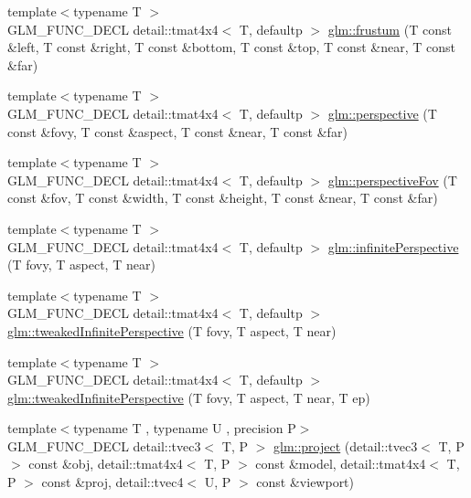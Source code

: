 \begin{DoxyCompactItemize}
\item 
{\footnotesize template$<$typename T $>$ }\\G\+L\+M\+\_\+\+F\+U\+N\+C\+\_\+\+D\+E\+CL detail\+::tmat4x4$<$ T, defaultp $>$ \hyperlink{group__gtc__matrix__transform_ga486d3d6819c04880559f3dccd38f9f58}{glm\+::frustum} (T const \&left, T const \&right, T const \&bottom, T const \&top, T const \&near, T const \&far)
\item 
{\footnotesize template$<$typename T $>$ }\\G\+L\+M\+\_\+\+F\+U\+N\+C\+\_\+\+D\+E\+CL detail\+::tmat4x4$<$ T, defaultp $>$ \hyperlink{group__gtc__matrix__transform_ga6c82aa0ea748cfbb16887d81cf6c5a10}{glm\+::perspective} (T const \&fovy, T const \&aspect, T const \&near, T const \&far)
\item 
{\footnotesize template$<$typename T $>$ }\\G\+L\+M\+\_\+\+F\+U\+N\+C\+\_\+\+D\+E\+CL detail\+::tmat4x4$<$ T, defaultp $>$ \hyperlink{group__gtc__matrix__transform_gac00bf68d4f7ec62380b84c5354567f71}{glm\+::perspective\+Fov} (T const \&fov, T const \&width, T const \&height, T const \&near, T const \&far)
\item 
{\footnotesize template$<$typename T $>$ }\\G\+L\+M\+\_\+\+F\+U\+N\+C\+\_\+\+D\+E\+CL detail\+::tmat4x4$<$ T, defaultp $>$ \hyperlink{group__gtc__matrix__transform_ga63ba1ddb9c4a08d4e58becd0dc5b725a}{glm\+::infinite\+Perspective} (T fovy, T aspect, T near)
\item 
{\footnotesize template$<$typename T $>$ }\\G\+L\+M\+\_\+\+F\+U\+N\+C\+\_\+\+D\+E\+CL detail\+::tmat4x4$<$ T, defaultp $>$ \hyperlink{group__gtc__matrix__transform_ga9d67732836d71a79dc21eb8f87603cb7}{glm\+::tweaked\+Infinite\+Perspective} (T fovy, T aspect, T near)
\item 
{\footnotesize template$<$typename T $>$ }\\G\+L\+M\+\_\+\+F\+U\+N\+C\+\_\+\+D\+E\+CL detail\+::tmat4x4$<$ T, defaultp $>$ \hyperlink{group__gtc__matrix__transform_gade8abc58c0ac541163e872eb66f3e5de}{glm\+::tweaked\+Infinite\+Perspective} (T fovy, T aspect, T near, T ep)
\item 
{\footnotesize template$<$typename T , typename U , precision P$>$ }\\G\+L\+M\+\_\+\+F\+U\+N\+C\+\_\+\+D\+E\+CL detail\+::tvec3$<$ T, P $>$ \hyperlink{group__gtc__matrix__transform_ga41227b7b98882dcbaa8dab52df372c7b}{glm\+::project} (detail\+::tvec3$<$ T, P $>$ const \&obj, detail\+::tmat4x4$<$ T, P $>$ const \&model, detail\+::tmat4x4$<$ T, P $>$ const \&proj, detail\+::tvec4$<$ U, P $>$ const \&viewport)

\end{DoxyCompactItemize}
